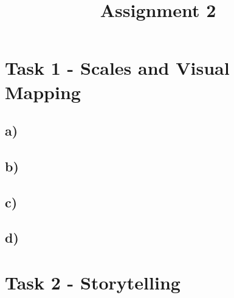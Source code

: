 \documentclass[a4paper]{article}
\date{}
\author{}
\title{Assignment 2}
\begin{document}
	\maketitle 
	\thispagestyle{fancy}
	
	\section*{Task 1 - Scales and Visual Mapping}
	\subsection*{a)}
	\subsection*{b)}
	\subsection*{c)}
	\subsection*{d)}
				
	
	\section*{Task 2 - Storytelling}
	
\end{document}
